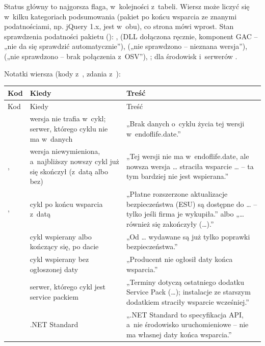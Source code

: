 Status główny to najgorsza flaga, w~kolejności z~tabeli. Wiersz może liczyć się w~kilku
kategoriach podsumowania (pakiet po końcu wsparcia ze znanymi podatnościami, np. jQuery 1.x,
jest w~obu), co strona mówi wprost. Stan sprawdzenia podatności pakietu ():
,  (DLL dołączona ręcznie, komponent GAC --
„nie da się sprawdzić automatycznie”),  („nie sprawdzono --
nieznana wersja”),  („nie sprawdzono -- brak połączenia z~OSV”),
; dla środowisk i~serwerów .

Notatki wiersza (kody z~, zdania z~):

\begin{xltabular}{\linewidth}{@{}>{\raggedright\arraybackslash}p{3.9cm} >{\raggedright\arraybackslash}p{3.9cm} >{\raggedright\arraybackslash}X@{}}
\toprule
Kod & Kiedy & Treść \\
\midrule
\endfirsthead
\toprule
Kod & Kiedy & Treść \\
\midrule
\endhead
{} & wersja nie trafia w~cykl; serwer, którego cyklu nie ma w~danych & „Brak danych o~cyklu życia tej wersji w~endoflife.date.” \\
,  & wersja niewymieniona, a~najbliższy nowszy cykl już się skończył (z~datą albo bez) & „Tej wersji nie ma w~endoflife.date, ale nowsza wersja … straciła wsparcie … -- ta tym bardziej nie jest wspierana.” \\
,  & cykl po końcu wsparcia z~datą  & „Płatne rozszerzone aktualizacje bezpieczeństwa (ESU) są dostępne do … -- tylko jeśli firma je wykupiła.” albo „… również się zakończyły (…).” \\
 & cykl wspierany albo kończący się, po dacie  & „Od … wydawane są już tylko poprawki bezpieczeństwa.” \\
 & cykl wspierany bez ogłoszonej daty & „Producent nie ogłosił daty końca wsparcia.” \\
 & serwer, którego cykl jest service packiem & „Terminy dotyczą ostatniego dodatku Service Pack (…); instalacje ze starszym dodatkiem straciły wsparcie wcześniej.” \\
 & .NET Standard & „.NET Standard to specyfikacja API, a~nie środowisko uruchomieniowe -- nie ma własnej daty końca wsparcia.” \\

\end{xltabular}
